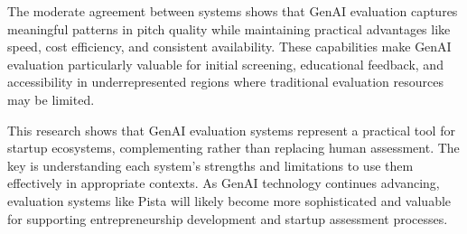 The moderate agreement between systems shows that GenAI evaluation captures meaningful patterns in pitch quality while maintaining practical advantages like speed, cost efficiency, and consistent availability. These capabilities make GenAI evaluation particularly valuable for initial screening, educational feedback, and accessibility in underrepresented regions where traditional evaluation resources may be limited.

This research shows that GenAI evaluation systems represent a practical tool for startup ecosystems, complementing rather than replacing human assessment. The key is understanding each system's strengths and limitations to use them effectively in appropriate contexts. As GenAI technology continues advancing, evaluation systems like Pista will likely become more sophisticated and valuable for supporting entrepreneurship development and startup assessment processes.